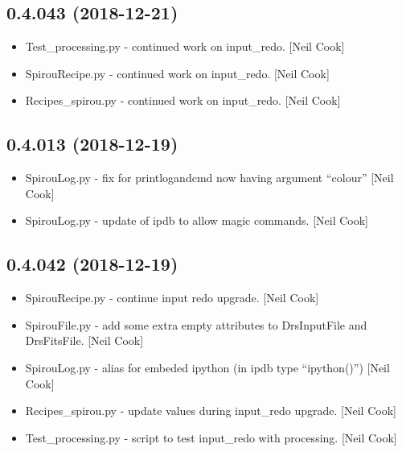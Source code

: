 \documentclass[a4paper,10pt,english]{report}
\begin{document}
\subsection{0.4.043 (2018-12-21)}
\label{\detokenize{misc/changelog:id222}}\begin{itemize}
\item {} 
Test\_processing.py - continued work on input\_redo. {[}Neil Cook{]}

\item {} 
SpirouRecipe.py - continued work on input\_redo. {[}Neil Cook{]}

\item {} 
Recipes\_spirou.py - continued work on input\_redo. {[}Neil Cook{]}

\end{itemize}


\subsection{0.4.013 (2018-12-19)}
\label{\detokenize{misc/changelog:id223}}\begin{itemize}
\item {} 
SpirouLog.py - fix for printlogandcmd now having argument “colour”
{[}Neil Cook{]}

\item {} 
SpirouLog.py - update of ipdb to allow magic commands. {[}Neil Cook{]}

\end{itemize}


\subsection{0.4.042 (2018-12-19)}
\label{\detokenize{misc/changelog:id224}}\begin{itemize}
\item {} 
SpirouRecipe.py - continue input redo upgrade. {[}Neil Cook{]}

\item {} 
SpirouFile.py - add some extra empty attributes to DrsInputFile and
DrsFitsFile. {[}Neil Cook{]}

\item {} 
SpirouLog.py - alias for embeded ipython (in ipdb type “ipython()”)
{[}Neil Cook{]}

\item {} 
Recipes\_spirou.py - update values during input\_redo upgrade. {[}Neil
Cook{]}

\item {} 
Test\_processing.py - script to test input\_redo with processing. {[}Neil
Cook{]}

\end{itemize}
\end{document}
